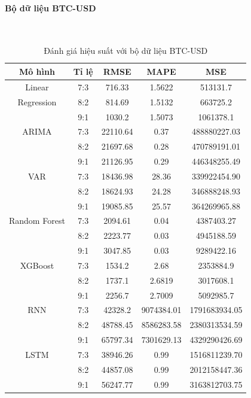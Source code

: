 \documentclass[conference]{IEEEtran}
\begin{document}
\begin{table}[H]
\begin{adjustbox}{width=0.4\textwidth}
\begin{tabular}{|c|c|c|c|c|}
\end{tabular}
\end{adjustbox}
\end{table}

\paragraph{\textbf{Bộ dữ liệu BTC-USD}} \mbox{} \\
\begin{table}[H]
 \centering
 \caption{Đánh giá hiệu suất với bộ dữ liệu BTC-USD}
\begin{adjustbox}{width=0.4\textwidth}
\begin{tabular}{|c|c|c|c|c|}
\hline
Mô hình & Tỉ lệ & RMSE & MAPE & MSE \\ \hline
Linear & 7:3 & 716.33 & 1.5622 & 513131.7 \\
Regression & 8:2 & 814.69 & 1.5132 & 663725.2 \\
& 9:1 & 1030.2 & 1.5073 & 1061378.1 \\ \hline
ARIMA & 7:3 & 22110.64 & 0.37 & 488880227.03 \\
& 8:2 & 21697.68 & 0.28 & 470789191.01 \\
& 9:1 & 21126.95 & 0.29 & 446348255.49 \\ \hline
VAR & 7:3 & 18436.98 & 28.36 & 339922454.90 \\
& 8:2 & 18624.93 & 24.28 & 346888248.93 \\
& 9:1 & 19085.85 & 25.57 & 364269965.88 \\ \hline
Random Forest & 7:3 & 2094.61 & 0.04 & 4387403.27 \\
& 8:2 & 2223.77 & 0.03 & 4945188.59 \\
& 9:1 & 3047.85 & 0.03 & 9289422.16 \\ \hline
XGBoost & 7:3 & 1534.2 & 2.68 & 2353884.9 \\
& 8:2 & 1737.1 & 2.6819 & 3017608.1 \\
& 9:1 & 2256.7 & 2.7009 & 5092985.7 \\ \hline
RNN & 7:3 & 42328.2 & 9074384.01 & 1791683934.05 \\
& 8:2 & 48788.45 & 8586283.58 & 2380313534.59 \\
& 9:1 & 65797.34 & 7301629.13 & 4329290426.69 \\ \hline
LSTM & 7:3 & 38946.26 & 0.99 & 1516811239.70 \\
& 8:2 & 44857.08 & 0.99 & 2012158447.36 \\
& 9:1 & 56247.77 & 0.99 & 3163812703.75 \\ \hline

\end{tabular}
\end{adjustbox}
\end{table}
\end{document}
